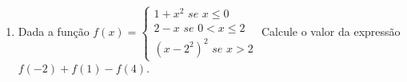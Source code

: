 \begin{enumerate}
\begin{minipage}[t]{.44\textwidth}
\begin{itemize}
\item[a)] $ f(x)=|x^2-4x+3|$
\item[b)] $f(x)= |x|^2-4|x|+3$
\item[c)] $ f(x)=\left\{\begin{array}{cc} 4x-3 \,\, se \,\, x \geq
0\\
x^2-3x+2 \,\, se \,\, x <0
\end{array}\right.$
\item[d)] $ f(x)=\left\{\begin{array}{cc} 1+x^2 \,\, se \,\, x \leq
0\\
2-x \,\, se \,\, 0 < x \leq 2 \\
(x-2)^2  \,\,se \,\,  x> 2
\end{array}\right.$
\end{itemize}
\end{minipage}
\begin{minipage}[t]{.44\textwidth}
\begin{itemize}
\item[e)] $f(x)=|x-5|+1$
\item[f)]$f(x)= |x-1|+ |2x-4|$
\item[g)]  $f(x)=\frac{|x|}{x}$
 \item[h)]$ f(x)=\left\{\begin{array}{cc} 1 \,\, se \,\, x \leq
1\\
|x-1| \,\, se \,\, x>1
\end{array}\right.$
\end{itemize}
\end{minipage}
\item Dada a função $f(x)=\left\{\begin{array}{cc} 1+x^2 \,\, se \,\, x \leq
0\\
2-x \,\, se \,\, 0 < x \leq 2 \\
(x-2^2)^2  \,\,se \,\,  x> 2
\end{array}\right.$  Calcule o valor da expressão $f(-2)+f(1)-f(4)$.


\end{enumerate}
